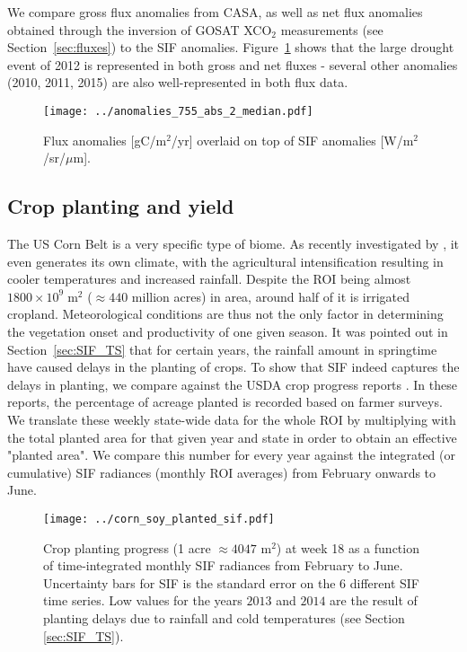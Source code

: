 \documentclass[preprint, a4paper, 10pt, times]{elsarticle}
\begin{document}
We compare gross flux anomalies from CASA, as well as net flux anomalies obtained through the inversion of GOSAT XCO$_2$ measurements (see Section~\ref{sec:fluxes}) to the SIF anomalies. Figure~\ref{fig:anomalies_3} shows that the large drought event of 2012 is represented in both gross and net fluxes - several other anomalies (2010, 2011, 2015) are also well-represented in both flux data. 

\begin{figure}[htbp]
\centering
\texttt{[image: ../anomalies\_755\_abs\_2\_median.pdf]}
\caption{Flux anomalies [gC/m$^2$/yr] overlaid on top of SIF anomalies [W/m$^2$/sr/$\mu$m].}
\label{fig:anomalies_3}
\end{figure}

\subsection{Crop planting and yield}

The US Corn Belt is a very specific type of biome. As recently investigated by \citet{Alter2017}, it even generates its own climate, with the agricultural intensification resulting in cooler temperatures and increased rainfall. Despite the ROI being almost $1800 \times 10^9\;\mathrm{m}^2$ ($\approx 440$ million acres) in area, around half of it is irrigated cropland. Meteorological conditions are thus not the only factor in determining the vegetation onset and productivity of one given season. It was pointed out in Section~\ref{sec:SIF_TS} that for certain years, the rainfall amount in springtime have caused delays in the planting of crops. To show that SIF indeed captures the delays in planting, we compare against the USDA crop progress reports \citep{USDA2010,USDA2011,USDA2012,USDA2013,USDA2014,USDA2015,USDA2016}. In these reports, the percentage of acreage planted is recorded based on farmer surveys. We translate these weekly state-wide data for the whole ROI by multiplying with the total planted area for that given year and state in order to obtain an effective "planted area". We compare this number for every year against the integrated (or cumulative) SIF radiances (monthly ROI averages) from February onwards to June.

\begin{figure}[htbp]
\centering
\texttt{[image: ../corn\_soy\_planted\_sif.pdf]}
\caption{Crop planting progress (1 acre $\approx 4047$ m$^2$) at week 18 as a function of time-integrated monthly SIF radiances from February to June. Uncertainty bars for SIF is the standard error on the 6 different SIF time series. Low values for the years $2013$ and $2014$ are the result of planting delays due to rainfall and cold temperatures (see Section \ref{sec:SIF_TS}).}
\label{fig:corn_soy_planted_sif}
\end{figure}
\end{document}
